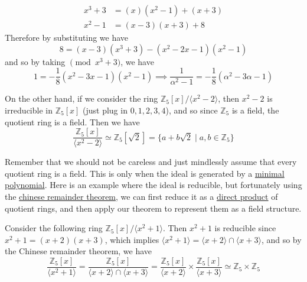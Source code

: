 \begin{example}
\begin{enumerate}
      \begin{align}
        x^3 + 3 & = (x) (x^2 - 1) + (x + 3) \label{hi}\\
        x^2 - 1 & = (x - 3) (x + 3) + 8
      \end{align}
      Therefore by substituting we have 
      \begin{equation}
        8 = (x - 3) (x^3 + 3) - (x^2 - 2x - 1) (x^2 - 1) 
      \end{equation} 
      and so by taking $\pmod{x^3 + 3}$, we have 
      \begin{equation}
        1 = -\frac{1}{8} (x^2 - 3x - 1) (x^2 - 1) \implies \frac{1}{\alpha^2 - 1} = -\frac{1}{8}(\alpha^2 - 3 \alpha - 1)
      \end{equation}
    \end{enumerate}
  \end{example}

  \begin{example}
    \label{ex:irreducible-quotient-rings}
    On the other hand, if we consider the ring $\mathbb{Z}_5 [x] / \langle x^2 - 2 \rangle$, then $x^2 - 2$ is irreducible in $\mathbb{Z}_5 [x]$ (just plug in $0, 1, 2, 3, 4$), and so since $\mathbb{Z}_5$ is a field, the quotient ring is a field. Then we have 
    \begin{equation}
      \frac{\mathbb{Z}_5 [x]}{\langle x^2 - 2 \rangle} \simeq \mathbb{Z}_5 [\sqrt{2}] = \{a + b \sqrt{2} \mid a, b \in \mathbb{Z}_5 \}
    \end{equation}
  \end{example} 

  Remember that we should not be careless and just mindlessly assume that every quotient ring is a field. This is only when the ideal is generated by a \hyperref[def:min_poly]{minimal polynomial}. Here is an example where the ideal is reducible, but fortunately using the \hyperref[thm:chinese-remainder-theorem]{chinese remainder theorem}, we can first reduce it as a \hyperref[def:direct-product]{direct product} of quotient rings, and then apply our theorem to represent them as a field structure. 

  \begin{example}
    \label{ex:quotient-ring-as-product-rings-with-chinese}
    Consider the following ring $\mathbb{Z}_5 [x] / \langle x^2 + 1 \rangle$. Then $x^2 + 1$ is reducible since $x^2 + 1 = (x + 2) (x + 3)$, which implies $\langle x^2 + 1 \rangle = \langle x + 2 \rangle \cap \langle x + 3 \rangle$, and so by the Chinese remainder theorem, we have 
    \begin{equation}
      \frac{\mathbb{Z}_5 [x]}{\langle x^2 + 1 \rangle} = \frac{\mathbb{Z}_5 [x]}{\langle x + 2 \rangle \cap \langle x + 3 \rangle} = \frac{\mathbb{Z}_5 [x]}{\langle x + 2 \rangle} \times \frac{\mathbb{Z}_5 [x]}{\langle x + 3 \rangle} \simeq \mathbb{Z}_5 \times \mathbb{Z}_5
    \end{equation}
  \end{example} 

